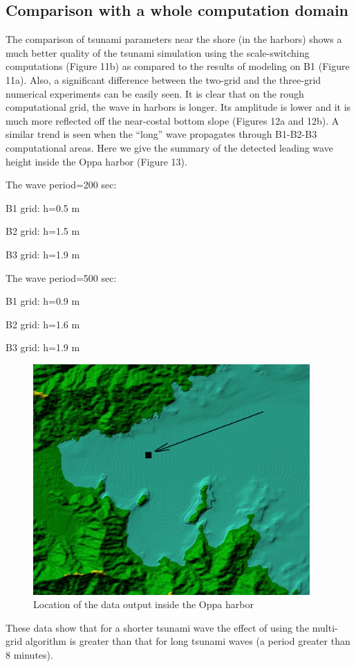 \documentclass{aip-cp}
\begin{document}
\subsection{Comparison with a whole computation domain}
The comparison of tsunami parameters near the shore (in the harbors) shows a 
much better quality of the tsunami simulation using the scale-switching 
computations (Figure 11b) as compared to the results of modeling on B1 
(Figure 11a). Also, a significant difference between 
the two-grid and the three-grid numerical experiments can be easily seen. It 
is clear that on the rough computational grid, the wave in harbors is 
longer. Its amplitude is lower and it is much more reflected off the 
near-costal bottom slope (Figures 12a and 12b). A similar trend is seen when the 
``long'' wave propagates through B1-B2-B3 computational areas. Here we give 
the summary of the detected leading wave height inside the Oppa harbor (Figure 13).

The wave period=200 sec:

B1 grid: h=0.5 m

B2 grid: h=1.5 m

B3 grid: h=1.9 m

The wave period=500 sec:

B1 grid: h=0.9 m

B2 grid: h=1.6 m

B3 grid: h=1.9 m

\begin{figure}[h]
  \centerline{\includegraphics[width=300pt]{art/Fig_13.png}}
  \caption{Location of the data output inside the Oppa harbor}
\end{figure}

These data show that for a shorter tsunami wave the effect of using the 
multi-grid algorithm is greater than that for long tsunami waves (a period 
greater than 8 minutes).
\end{document}
